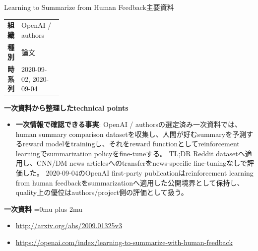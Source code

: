 \begin{technicalnote}{Learning to Summarize from Human Feedback}{主要資料}
\begingroup
\begin{tabularx}{\linewidth}{@{}>{\bfseries}p{0.22\linewidth}X@{}}
組織 & OpenAI / authors \\
種別 & 論文 \\
時系列 & 2020-09-02, 2020-09-04 \\
\end{tabularx}
\smallskip
{\bfseries 一次資料から整理したtechnical points}
\begin{itemize}[leftmargin=1.5em,itemsep=0.35em]
\item \textbf{一次情報で確認できる事実}: OpenAI / authorsの選定済み一次資料では、human summary comparison datasetを収集し、人間が好むsummaryを予測するreward modelをtrainingし、それをreward functionとしてreinforcement learningでsummarization policyをfine-tuneする。 TL;DR Reddit datasetへ適用し、CNN/DM news articlesへのtransferをnews-specific fine-tuningなしで評価した。 2020-09-04のOpenAI first-party publicationはreinforcement learning from human feedbackをsummarizationへ適用した公開境界として保持し、quality上の優位はauthors/project側の評価として扱う。
\end{itemize}
\begin{minipage}{\linewidth}
\begin{samepage}
{\bfseries 一次資料}
\begingroup\sloppy
\Urlmuskip=0mu plus 2mu\relax
\begin{itemize}[leftmargin=1.5em,itemsep=0.25em]
\item {\scriptsize\url{http://arxiv.org/abs/2009.01325v3}}
\item {\scriptsize\url{https://openai.com/index/learning-to-summarize-with-human-feedback}}
\end{itemize}
\endgroup
\end{samepage}
\end{minipage}
\endgroup
\end{technicalnote}
\medskip
